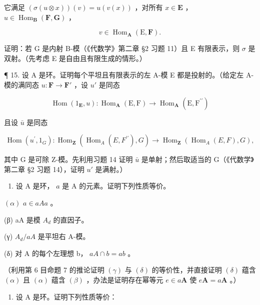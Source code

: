 它满足 \((\sigma(u \otimes x))(v) = u(v(x))\) ，对所有 \(x \in \mathbf{E}\) ， \(u \in \operatorname{Hom}_{\mathbf{B}}(\mathbf{F}, \mathbf{G})\) ，

\[
v \in \operatorname{Hom} _ {\mathbf {A}} (\mathrm{E}, \mathbf {F}).
\]

证明：若 G 是内射 B-模（《代数学》第二章 §2 习题 11）且 E 有限表示，则 \(\sigma\) 是双射。（先考虑 E 是自由且有限生成的情形。）

¶ 15. 设 A 是环。证明每个平坦且有限表示的左 A-模 E 都是投射的。（给定左 A-模的满同态 \(u: \mathbf{F} \to \mathbf{F}'\) ，设 \(u'\) 是同态

\[
\operatorname{Hom} \left(1 _ {\mathbf {E}}, u\right): \operatorname{Hom} _ {\mathbf {A}} (\mathrm{E}, \mathrm{F}) \rightarrow \operatorname{Hom} _ {\mathbf {A}} (\mathrm{E}, \mathrm{F} ^ {\prime \prime})
\]

且设 \(\bar{u}\) 是同态

\[
\operatorname{Hom} \left(u ^ {\prime}, 1 _ {G}\right): \operatorname{Hom} _ {\mathbf {Z}} \left(\operatorname{Hom} _ {A} (E, F ^ {\prime \prime}), G\right)\rightarrow \operatorname{Hom} _ {\mathbf {Z}} \left(\operatorname{Hom} _ {A} (E, F), G\right),
\]

其中 G 是可除 Z-模。先利用习题 14 证明 \(\bar{u}\) 是单射；然后取适当的 G（《代数学》第二章 §2 习题 14），证明 \(u'\) 是满射。）

\begin{enumerate}
\def\labelenumi{\arabic{enumi}.}
\setcounter{enumi}{15}
\tightlist
\item
  设 A 是环， \(a\) 是 A 的元素。证明下列性质等价。
\end{enumerate}

\((\alpha)\) \(a \in aAa\) 。

(β) aA 是模 \(A_{d}\) 的直因子。

(γ) \(A_{d}/aA\) 是平坦右 A-模。

(δ) 对 A 的每个左理想 b， \(aA \cap b = ab\) 。

（利用第 6 目命题 7 的推论证明 \((\gamma)\) 与 \((\delta)\) 的等价性，并直接证明 \((\delta)\) 蕴含 \((\alpha)\) 且 \((\alpha)\) 蕴含 \((\beta)\) ，办法是证明存在幂等元 \(e \in a\mathbf{A}\) 使 \(e\mathbf{A} = a\mathbf{A}\) 。）

\begin{enumerate}
\def\labelenumi{\arabic{enumi}.}
\setcounter{enumi}{16}
\tightlist
\item
  设 A 是环。证明下列性质等价：
\end{enumerate}

